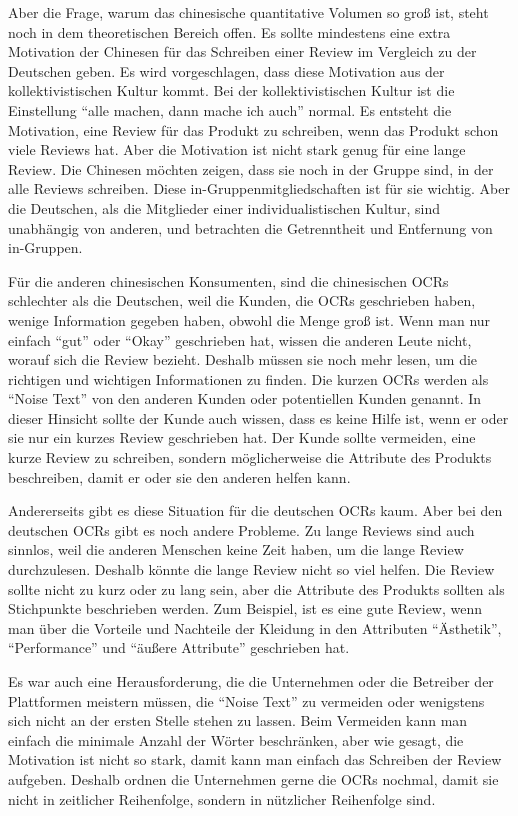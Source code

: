 Aber die Frage, warum das chinesische quantitative Volumen so groß ist, steht noch in dem theoretischen Bereich offen. Es sollte mindestens eine extra Motivation der Chinesen für das Schreiben einer Review im Vergleich zu der Deutschen geben. Es wird vorgeschlagen, dass diese Motivation aus der kollektivistischen Kultur kommt. Bei der kollektivistischen Kultur ist die Einstellung ``alle machen, dann mache ich auch'' normal. Es entsteht die Motivation, eine Review für das Produkt zu schreiben, wenn das Produkt schon viele Reviews hat. Aber die Motivation ist nicht stark genug für eine lange Review. Die Chinesen möchten zeigen, dass sie noch in der Gruppe sind, in der alle Reviews schreiben. Diese in-Gruppenmitgliedschaften ist für sie wichtig. Aber die Deutschen, als die Mitglieder einer individualistischen Kultur, sind unabhängig von anderen, und betrachten die Getrenntheit und Entfernung von in-Gruppen. \citep{singelis1994measurement}

Für die anderen chinesischen Konsumenten, sind die chinesischen \ac{OCRs} schlechter als die Deutschen, weil die Kunden, die \ac{OCRs} geschrieben haben, wenige Information gegeben haben, obwohl die Menge groß ist. Wenn man nur einfach ``gut'' oder ``Okay'' geschrieben hat, wissen die anderen Leute nicht, worauf sich die Review bezieht. Deshalb müssen sie noch mehr lesen, um die richtigen und wichtigen Informationen zu finden. Die kurzen \ac{OCRs} werden als ``Noise Text'' von den anderen Kunden oder potentiellen Kunden genannt. In dieser Hinsicht sollte der Kunde auch wissen, dass es keine Hilfe ist, wenn er oder sie nur ein kurzes Review geschrieben hat. Der Kunde sollte vermeiden, eine kurze Review zu schreiben, sondern möglicherweise die Attribute des Produkts beschreiben, damit er oder sie den anderen helfen kann. 

Andererseits gibt es diese Situation für die deutschen \ac{OCRs} kaum. Aber bei den deutschen \ac{OCRs} gibt es noch andere Probleme. Zu lange Reviews sind auch sinnlos, weil die anderen Menschen keine Zeit haben, um die lange Review durchzulesen. Deshalb könnte die lange Review nicht so viel helfen. Die Review sollte nicht zu kurz oder zu lang sein, aber die Attribute des Produkts sollten als Stichpunkte beschrieben werden. Zum Beispiel, ist es eine gute Review, wenn man über die Vorteile und Nachteile der Kleidung in den Attributen ``Ästhetik'', ``Performance'' und ``äußere Attribute'' geschrieben hat.

Es war auch eine Herausforderung, die die Unternehmen oder die Betreiber der Plattformen meistern müssen, die ``Noise Text'' zu vermeiden oder wenigstens sich nicht an der ersten Stelle stehen zu lassen. Beim Vermeiden kann man einfach die minimale Anzahl der Wörter beschränken, aber wie gesagt, die Motivation ist nicht so stark, damit kann man einfach das Schreiben der Review aufgeben. Deshalb ordnen die Unternehmen gerne die \ac{OCRs} nochmal, damit sie nicht in zeitlicher Reihenfolge, sondern in nützlicher Reihenfolge sind. 

